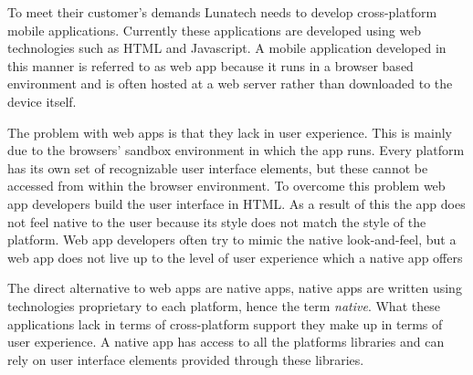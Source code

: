 

To meet their customer's demands Lunatech needs to develop cross-platform mobile applications. Currently these applications are developed using web technologies such as HTML and Javascript. A mobile application developed in this manner is referred to as web app because it runs in a browser based environment and is often hosted at a web server rather than downloaded to the device itself.




The problem with web apps is that they lack in user experience. This is mainly due to the browsers' sandbox environment in which the app runs. Every platform has its own set of recognizable user interface elements, but these cannot be accessed from within the browser environment. To overcome this problem web app developers build the user interface in HTML.  As a result of this the app does not feel native to the user because its style does not match the style of the platform. Web app developers often try to mimic the native look-and-feel, but a web app does not live up to the level of user experience which a native app offers


The direct alternative to web apps are native apps, native apps are written using technologies proprietary to each platform, hence the term \emph{native}. What these applications lack in terms of cross-platform support they make up in terms of user experience.  A native app has access to all the platforms libraries and can rely on user interface elements provided through these libraries.

